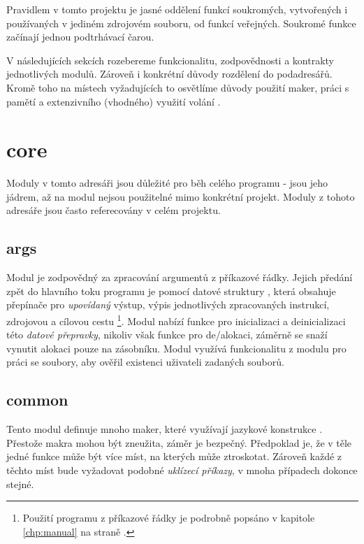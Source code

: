 \documentclass[czech, kiv, he, sem, pdf, viewonly]{fasthesis}
\begin{document}


Pravidlem v tomto projektu je jasné oddělení funkcí soukromých, vytvořených i
používaných v jediném zdrojovém souboru, od funkcí veřejných. Soukromé funkce
začínají jednou podtrhávací čarou.

V následujících sekcích rozebereme funkcionalitu, zodpovědnosti a kontrakty
jednotlivých modulů. Zároveň i konkrétní důvody rozdělení do podadresářů. Kromě
toho na místech vyžadujících to osvětlíme důvody použití maker, práci s pamětí a
extenzivního (vhodného) využití volání .

\section{core}

Moduly v tomto adresáři jsou důležité pro běh celého programu - jsou jeho
jádrem, až na modul  nejsou použitelné mimo konkrétní projekt.
Moduly z tohoto adresáře jsou často referecovány v celém projektu.

\subsection{args}

Modul je zodpovědný za zpracování argumentů z příkazové řádky. Jejich předání
zpět do hlavního toku programu je pomocí datové struktury ,
která obsahuje přepínače pro \textit{upovídaný} výstup, výpis jednotlivých
zpracovaných instrukcí, zdrojovou a cílovou cestu \footnote{Použití programu z
příkazové řádky je podrobně popsáno v kapitole \ref{chp:manual} na straně
\pageref{chp:manual}.}. Modul nabízí funkce pro inicializaci a deinicializaci
této \textit{datové přepravky}, nikoliv však funkce pro de/alokaci, záměrně se
snaží vynutit alokaci pouze na zásobníku. Modul využívá funkcionalitu z modulu
pro práci se soubory, aby ověřil existenci uživateli zadaných souborů.

\subsection{common}\label{sec:common}

Tento modul definuje mnoho maker, které využívají jazykové konstrukce
. Přestože makra mohou být zneužita, záměr je bezpečný. Předpoklad
je, že v těle jedné funkce může být více míst, na kterých může ztroskotat.
Zároveň každé z těchto míst bude vyžadovat podobné \textit{uklízecí příkazy}, v
mnoha případech dokonce stejné.
\end{document}
